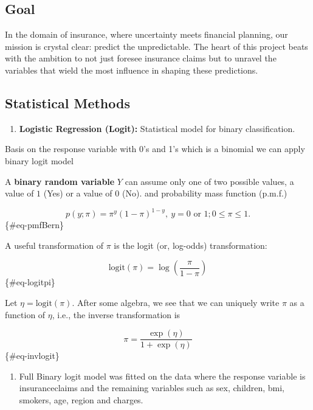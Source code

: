\documentclass[
]{article}
\providecommand{\tightlist}{%
  \setlength{\itemsep}{0pt}\setlength{\parskip}{0pt}}
\begin{document}
\newpage

\hypertarget{goal}{%
\subsection{Goal}\label{goal}}

In the domain of insurance, where uncertainty meets financial planning,
our mission is crystal clear: predict the unpredictable. The heart of
this project beats with the ambition to not just foresee insurance
claims but to unravel the variables that wield the most influence in
shaping these predictions.

\hypertarget{statistical-methods}{%
\subsection{Statistical Methods}\label{statistical-methods}}

\begin{enumerate}
\def\labelenumi{\arabic{enumi}.}
\tightlist
\item
  \textbf{Logistic Regression (Logit):} Statistical model for binary
  classification.
\end{enumerate}

Basis on the response variable with 0's and 1's which is a binomial we
can apply binary logit model

A \textbf{binary random variable} \(Y\) can assume only one of two
possible values, a value of \(1\) (Yes) or a value of \(0\) (No). and
probability mass function (p.m.f.)

\[
p(y; \pi) = \pi^y (1-\pi)^{1-y},~y = 0 \mbox{ or } 1; 0 \le \pi  \le 1. 
\] \{\#eq-pmfBern\}

A useful transformation of \(\pi\) is the logit (or, log-odds)
transformation:

\[
\text{logit}(\pi) = \log \left(\frac{\pi}{1-\pi}\right)
\] \{\#eq-logitpi\}

Let \(\eta = \text{logit}(\pi)\). After some algebra, we see that we can
uniquely write \(\pi\) as a function of \(\eta\), i.e., the inverse
transformation is

\[
\pi = \frac{\exp(\eta)}{1+\exp(\eta)}
\] \{\#eq-invlogit\}

\begin{enumerate}
\def\labelenumi{\arabic{enumi}.}
\tightlist
\item
  Full Binary logit model was fitted on the data where the response
  variable is insuranceclaims and the remaining variables such as sex,
  children, bmi, smokers, age, region and charges.
\end{enumerate}
\end{document}
